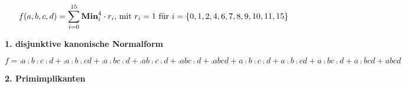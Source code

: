 \documentclass{CInf_practice}
\begin{document}
\begin{align*}
f(a,b,c,d) = \sum\limits^{15}_{i=0} \text{\bf Min}^{4}_i \cdot r_i, &\text{ mit } r_i=1 \text{ für } i = \left\{0,1,2,4,6,7,8,9,10,11,15\right\}\\
\end{align*}
%

\textbf{1. disjunktive kanonische Normalform}

$f = \comp a \comp b \comp c \comp d
   + \comp a \comp b \comp c       d
   + \comp a \comp b       c \comp d
   + \comp a       b \comp c \comp d
   + \comp a       b       c \comp d
   + \comp a       b       c       d
   +       a \comp b \comp c \comp d
   +       a \comp b \comp c       d
   +       a \comp b       c \comp d
   +       a \comp b       c       d
   +       a       b       c       d$
  
\bigskip

\textbf{2. Primimplikanten}
\end{document}
